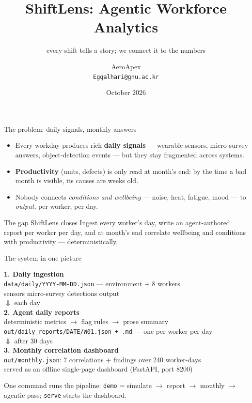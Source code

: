 \documentclass[aspectratio=169]{beamer}
\title{ShiftLens: Agentic Workforce Analytics}
\subtitle{every shift tells a story; we connect it to the numbers}
\author{AeroApex \\ \texttt{Egqalhari@gnu.ac.kr}}
\date{October 2026}
\begin{document}
\begin{frame}
  \titlepage
\end{frame}

\begin{frame}{The problem: daily signals, monthly answers}
  \begin{itemize}
    \item Every workday produces rich \textbf{daily signals} --- wearable
          sensors, micro-survey answers, object-detection events --- but they
          stay fragmented across systems.
    \item \textbf{Productivity} (units, defects) is only read at month's end:
          by the time a bad month is visible, its causes are weeks old.
    \item Nobody connects \emph{conditions and wellbeing} --- noise, heat,
          fatigue, mood --- to \emph{output}, per worker, per day.
  \end{itemize}
  \begin{block}{The gap ShiftLens closes}
    Ingest every worker's day, write an agent-authored report per worker per
    day, and at month's end correlate wellbeing and conditions with
    productivity --- deterministically.
  \end{block}
\end{frame}

\begin{frame}{The system in one picture}
  \begin{center}
    \textbf{1. Daily ingestion}\\[2pt]
    \texttt{data/daily/YYYY-MM-DD.json} --- environment + 8 workers\\
    sensors \textbullet{} micro-survey \textbullet{} detections \textbullet{} output\\[6pt]
    $\Downarrow$ \quad each day\\[4pt]
    \textbf{2. Agent daily reports}\\[2pt]
    deterministic metrics $\rightarrow$ flag rules $\rightarrow$ prose summary\\
    \texttt{out/daily\_reports/DATE/W01.json + .md} --- one per worker per day\\[6pt]
    $\Downarrow$ \quad after 30 days\\[4pt]
    \textbf{3. Monthly correlation dashboard}\\[2pt]
    \texttt{out/monthly.json}: 7 correlations + findings over 240 worker-days\\
    served as an offline single-page dashboard (FastAPI, port 8200)
  \end{center}
  One command runs the pipeline: \texttt{demo} = simulate $\rightarrow$ report
  $\rightarrow$ monthly $\rightarrow$ agentic pass; \texttt{serve} starts the
  dashboard.
\end{frame}
\end{document}
